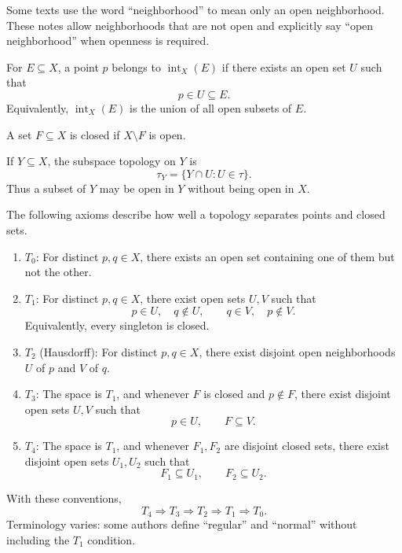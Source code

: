 \documentclass[answers,12pt,addpoints]{exam}
\begin{document}
\begin{remark}
Some texts use the word ``neighborhood'' to mean only an
open neighborhood. These notes allow neighborhoods that
are not open and explicitly say ``open neighborhood''
when openness is required.
\end{remark}

\begin{definition}
For $E\subseteq X$, a point $p$ belongs to
$\operatorname{int}_X(E)$ if there exists an open set $U$
such that
\[
p\in U\subseteq E.
\]
Equivalently, $\operatorname{int}_X(E)$ is the union of all
open subsets of $E$.
\end{definition}

\begin{definition}
A set $F\subseteq X$ is closed if $X\setminus F$ is open.
\end{definition}

\begin{definition}
If $Y\subseteq X$, the subspace topology on $Y$ is
\[
\tau_Y=\{Y\cap U:U\in\tau\}.
\]
Thus a subset of $Y$ may be open in $Y$ without being
open in $X$.
\end{definition}

\begin{remark}
The following axioms describe how well a topology
separates points and closed sets.
\begin{enumerate}
    \item $T_0$:
    For distinct $p,q\in X$, there exists an open set
    containing one of them but not the other.

    \item $T_1$:
    For distinct $p,q\in X$, there exist open sets
    $U,V$ such that
    \[
    p\in U,\quad q\notin U,
    \qquad
    q\in V,\quad p\notin V.
    \]
    Equivalently, every singleton is closed.

    \item $T_2$ (Hausdorff):
    For distinct $p,q\in X$, there exist disjoint open
    neighborhoods $U$ of $p$ and $V$ of $q$.

    \item $T_3$:
    The space is $T_1$, and whenever $F$ is closed and
    $p\notin F$, there exist disjoint open sets $U,V$
    such that
    \[
    p\in U,\qquad F\subseteq V.
    \]

    \item $T_4$:
    The space is $T_1$, and whenever $F_1,F_2$ are
    disjoint closed sets, there exist disjoint open sets
    $U_1,U_2$ such that
    \[
    F_1\subseteq U_1,\qquad F_2\subseteq U_2.
    \]
\end{enumerate}
With these conventions,
\[
T_4\Longrightarrow T_3\Longrightarrow T_2
\Longrightarrow T_1\Longrightarrow T_0.
\]
Terminology varies: some authors define ``regular'' and
``normal'' without including the $T_1$ condition.
\end{remark}
\end{document}
